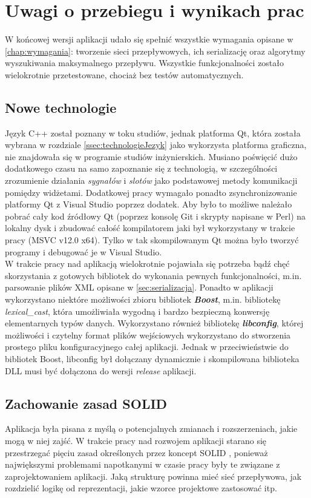 \chapter{Uwagi o przebiegu i wynikach prac}
W końcowej wersji aplikacji udało się spełnić wszystkie wymagania opisane w \ref{chap:wymagania}: tworzenie sieci przepływowych, ich serializację oraz algorytmy wyszukiwania maksymalnego przepływu. Wszystkie funkcjonalności zostało wielokrotnie przetestowane, chociaż bez testów automatycznych.
\section{Nowe technologie}
Język C++ został poznany w toku studiów, jednak platforma Qt, która została wybrana w rozdziale \ref{ssec:technologieJezyk} jako wykorzysta platforma graficzna, nie znajdowała się w programie studiów inżynierskich. Musiano poświęcić dużo dodatkowego czasu na samo zapoznanie się z technologią, w szczególności zrozumienie działania \textit{sygnałów} i \textit{slotów} jako podstawowej metody komunikacji pomiędzy widżetami. Dodatkowej pracy wymagało ponadto zsynchronizowanie platformy Qt z Visual Studio poprzez dodatek. Aby było to możliwe należało pobrać cały kod źródłowy Qt (poprzez konsolę Git i skrypty napisane w Perl) na lokalny dysk i zbudować całość kompilatorem jaki był wykorzystany w trakcie pracy (MSVC v12.0 x64). Tylko w tak skompilowanym Qt można było tworzyć programy i debugować je w Visual Studio.\\\indent
W trakcie pracy nad aplikacją wielokrotnie pojawiała się potrzeba bądź chęć skorzystania z gotowych bibliotek do wykonania pewnych funkcjonalności, m.in. parsowanie plików XML opisane w \ref{sec:serializacja}. Ponadto w aplikacji wykorzystano niektóre możliwości zbioru bibliotek \textbf{\textit{Boost}}, m.in. bibliotekę \emph{lexical\_cast}, która umożliwiała wygodną i bardzo bezpieczną konwersję elementarnych typów danych. Wykorzystano również bibliotekę \textbf{\textit{libconfig}}, której możliwości i czytelny format plików wejściowych wykorzystano do stworzenia prostego pliku konfiguracyjnego całej aplikacji. Jednak w przeciwieństwie do bibliotek Boost, libconfig był dołączany dynamicznie i skompilowana biblioteka DLL musi być dołączona do wersji \textit{release} aplikacji.
\section{Zachowanie zasad SOLID}\label{sec:solid}
Aplikacja była pisana z myślą o potencjalnych zmianach i rozszerzeniach, jakie mogą w niej zajść. W trakcie pracy nad rozwojem aplikacji starano się przestrzegać pięciu zasad określonych przez koncept SOLID \cite{id:CleanCodeSolid}\cite{id:solidWebsite}, ponieważ największymi problemami napotkanymi w czasie pracy były te związane z zaprojektowaniem aplikacji. Jaką strukturę powinna mieć sieć przepływowa, jak rozdzielić logikę od reprezentacji, jakie wzorce projektowe zastosować itp.
